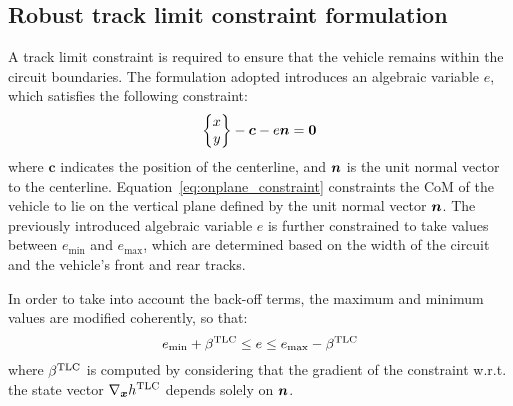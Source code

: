 \subsection{Robust track limit constraint formulation}
\label{sec:TLC}
A track limit constraint is required to ensure that the vehicle remains within the circuit boundaries. The formulation adopted introduces an algebraic variable $e$, which satisfies the following constraint:
\begin{equation}
	\begin{Bmatrix}
		x\\y
	\end{Bmatrix}
	-\boldsymbol{c} - e\bn=\boldsymbol{0} \label{eq:onplane_constraint}
\end{equation}
where $\boldsymbol{c}$ indicates the position of the centerline, and $\boldsymbol{n}$ is the unit normal vector to the centerline. Equation~\eqref{eq:onplane_constraint} constraints the CoM of the vehicle to lie on the vertical plane defined by the unit normal vector $\boldsymbol{n}$. The previously introduced algebraic variable $e$ is further constrained to take values between $e_\textrm{min}$ and $e_\textrm{max}$, which are determined based on the width of the circuit and the vehicle's front and rear tracks.

In order to take into account the back-off terms, the maximum and minimum values are modified coherently, so that:
\begin{equation}
	e_\textrm{min} + \be^\textrm{TLC} \leq e \leq e_\textrm{max} - \be^\textrm{TLC}\label{eq:TLC}
\end{equation}
where $\beta^\textrm{TLC}$ is computed by considering that the gradient of the constraint w.r.t. the state vector $\nabla_{\boldsymbol{x}}h^\textrm{TLC}$ depends solely on $\boldsymbol{n}$.